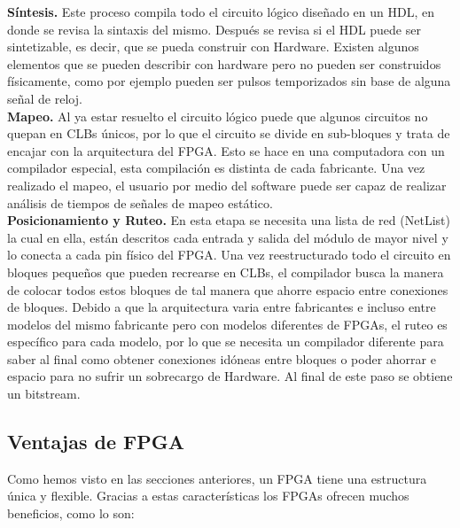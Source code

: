 \documentclass[twoside,spanish,ESP,MSc]{plantillaLabUPV}
\theoremstyle{definition}
\newcommand{\f}{FPGA }
\newcommand{\fs}{FPGAs }
\begin{document}

\checkmark\textbf{Síntesis.} Este proceso compila todo el circuito lógico diseñado en un HDL, en donde se revisa la sintaxis del mismo. Después se revisa si el HDL puede ser sintetizable, es decir, que se pueda construir con Hardware. Existen algunos elementos que se pueden describir con hardware pero no pueden ser construidos físicamente, como por ejemplo pueden ser pulsos temporizados sin base de alguna señal de reloj.\\

\checkmark\textbf{Mapeo.} Al ya estar resuelto el circuito lógico puede que algunos circuitos no quepan en CLBs únicos, por lo que el circuito se divide en sub-bloques y trata de encajar con la arquitectura del FPGA. Esto se hace en una computadora con un compilador especial, esta compilación es distinta de cada fabricante. Una vez realizado el mapeo, el usuario por medio del software puede ser capaz de realizar análisis de tiempos de señales de mapeo estático.\\

\checkmark\textbf{Posicionamiento y Ruteo.} En esta etapa se necesita una lista de red (NetList) la cual en ella, están descritos cada entrada y salida del módulo de mayor nivel y lo conecta a cada pin físico del FPGA.
Una vez reestructurado todo el circuito en bloques pequeños que pueden recrearse en CLBs, el compilador busca la manera de colocar todos estos bloques de tal manera que ahorre espacio entre conexiones de bloques. Debido a que la arquitectura varia entre fabricantes e incluso entre modelos del mismo fabricante pero con modelos diferentes de FPGAs, el ruteo es específico para cada modelo, por lo que se necesita un compilador diferente para saber al final como obtener conexiones idóneas entre bloques o poder ahorrar e espacio para no sufrir un sobrecargo de Hardware. Al final de este paso se obtiene un bitstream. %
%


\subsection{Ventajas de \f}
Como hemos visto en las secciones anteriores, un \f tiene una estructura única y flexible. Gracias a estas características los \fs ofrecen muchos beneficios, como lo son:
\end{document}
